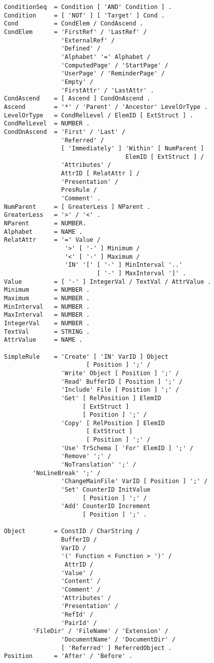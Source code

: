 \begin{verbatim}
ConditionSeq  = Condition [ 'AND' Condition ] .
Condition     = [ 'NOT' ] [ 'Target' ] Cond .
Cond          = CondElem / CondAscend .
CondElem      = 'FirstRef' / 'LastRef' /
                'ExternalRef' /
                'Defined' /
                'Alphabet' '=' Alphabet /
                'ComputedPage' / 'StartPage' / 
                'UserPage' / 'ReminderPage' /
                'Empty' /
                'FirstAttr' / 'LastAttr' .
CondAscend    = [ Ascend ] CondOnAscend .
Ascend        = '*' / 'Parent' / 'Ancestor' LevelOrType .
LevelOrType   = CondRelLevel / ElemID [ ExtStruct ] .
CondRelLevel  = NUMBER .
CondOnAscend  = 'First' / 'Last' /
                'Referred' / 
                [ 'Immediately' ] 'Within' [ NumParent ]
                                  ElemID [ ExtStruct ] /
                'Attributes' /
                AttrID [ RelatAttr ] /
                'Presentation' /
                PresRule /
                'Comment' .		  
NumParent     = [ GreaterLess ] NParent .
GreaterLess   = '>' / '<' .
NParent       = NUMBER.
Alphabet      = NAME .
RelatAttr     = '=' Value /
                 '>' [ '-' ] Minimum /
                 '<' [ '-' ] Maximum /
                 'IN' '[' [ '-' ] MinInterval '..'
                          [ '-' ] MaxInterval ']' .
Value         = [ '-' ] IntegerVal / TextVal / AttrValue .
Minimum       = NUMBER .
Maximum       = NUMBER .
MinInterval   = NUMBER .
MaxInterval   = NUMBER .
IntegerVal    = NUMBER .
TextVal       = STRING .
AttrValue     = NAME .

SimpleRule    = 'Create' [ 'IN' VarID ] Object
                       [ Position ] ';' /
                'Write' Object [ Position ] ';' /
                'Read' BufferID [ Position ] ';' /
                'Include' File [ Position ] ';' /
                'Get' [ RelPosition ] ElemID 
                      [ ExtStruct ] 
                      [ Position ] ';' /
                'Copy' [ RelPosition ] ElemID 
                       [ ExtStruct ] 
                       [ Position ] ';' /
                'Use' TrSchema [ 'For' ElemID ] ';' /
                'Remove' ';' /
                'NoTranslation' ';' /
		'NoLineBreak' ';' /
                'ChangeMainFile' VarID [ Position ] ';' /
                'Set' CounterID InitValue
                      [ Position ] ';' /
                'Add' CounterID Increment
                      [ Position ] ';' .

Object        = ConstID / CharString /
                BufferID /
                VarID /
                '(' Function < Function > ')' /
                 AttrID /
                'Value' /
                'Content' /
                'Comment' / 
                'Attributes' /
                'Presentation' /
                'RefId' /
                'PairId' /
		'FileDir' / 'FileName' / 'Extension' /
                'DocumentName' / 'DocumentDir' /
                [ 'Referred' ] ReferredObject .
Position      = 'After' / 'Before' .


\end{verbatim}
